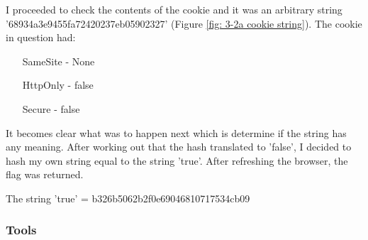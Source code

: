 I proceeded to check the contents of the cookie and it was
an arbitrary string '68934a3e9455fa72420237eb05902327' (Figure \vref{fig: 3-2a cookie string}). The
cookie in question had:
\begin{itemize}
    \item[SameSite] - None
    \item[HttpOnly] - false
    \item[Secure] - false
\end{itemize}
It becomes clear what was to happen next which is determine if the string
has any meaning. After working out that the hash translated to 'false', I
decided to hash my own string equal to the string 'true'.
After refreshing the browser, the flag was returned.

The string 'true' = b326b5062b2f0e69046810717534cb09

\subsubsection{Tools}

